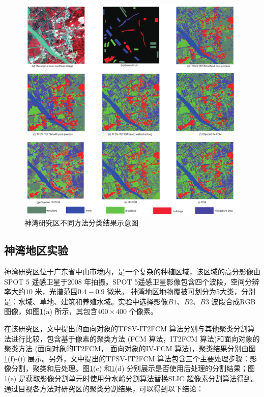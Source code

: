 \begin{figure}[htb]
    \centering
    \includegraphics[width=1.0\textwidth]{figures/shenwan}
    \caption{神湾研究区不同方法分类结果示意图 }\label{fig:shenwan}
\end{figure}

\subsection{神湾地区实验}
\label{subsec::chap03-4-1}
神湾研究区位于广东省中山市境内，是一个复杂的种植区域，该区域的高分影像由SPOT 5 遥感卫星于2008 年拍摄。SPOT 5遥感卫星影像包含四个波段，空间分辨率大约$10$ 米，光谱范围$0.4-0.9$ 微米。 神湾地区地物覆被可划分为5大类，分别是：水域、草地、建筑和养殖水域。实验中选择影像$B1$、$B2$、$B3$ 波段合成RGB 图像，如图\ref{fig:shenwan}(a) 所示，其包含$400 \times 400$ 个像素。

在该研究区，文中提出的面向对象的TFSV-IT2FCM 算法分别与其他聚类分割算法进行比较，包含基于像素的聚类方法 (FCM 算法，IT2FCM 算法)和面向对象的聚类方法 (面向对象的IT2FCM， 面向对象的IV-FCM 算法)，聚类结果分别由图\ref{fig:shenwan}(f)-(i) 展示。另外，文中提出的TFSV-IT2FCM 算法包含三个主要处理步骤：影像分割，聚类和后处理。图\ref{fig:shenwan}(c) 和\ref{fig:shenwan}(d) 分别展示是否使用后处理的分割结果；图\ref{fig:shenwan}(e) 是获取影像分割单元时使用分水岭分割算法替换SLIC 超像素分割算法得到。通过目视各方法对研究区的聚类分割结果，可以得到以下结论：

